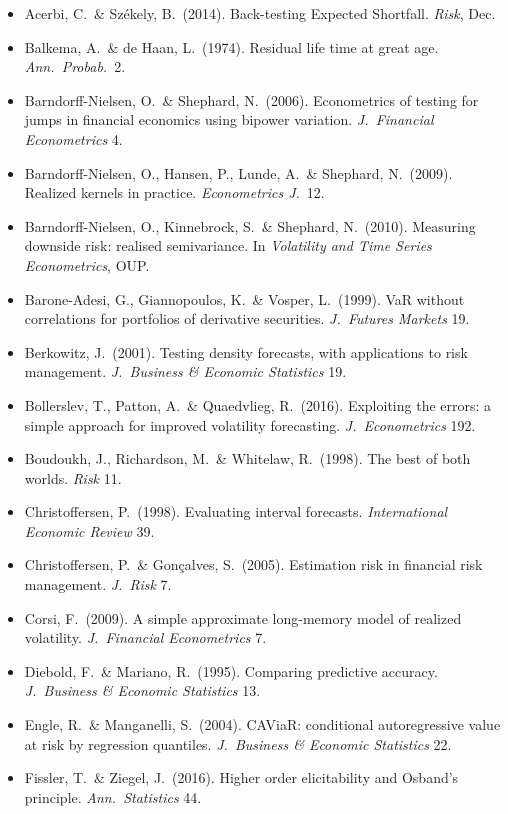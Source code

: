 \documentclass[11pt,a4paper]{article}
\begin{document}
{\small
\begin{itemize}[nosep,leftmargin=*]
\item Acerbi, C.\ \& Székely, B.\ (2014). Back-testing Expected Shortfall. \emph{Risk}, Dec.
\item Balkema, A.\ \& de Haan, L.\ (1974). Residual life time at great age. \emph{Ann.\ Probab.}\ 2.
\item Barndorff-Nielsen, O.\ \& Shephard, N.\ (2006). Econometrics of testing for jumps in financial economics using bipower variation. \emph{J.\ Financial Econometrics} 4.
\item Barndorff-Nielsen, O., Hansen, P., Lunde, A.\ \& Shephard, N.\ (2009). Realized kernels in practice. \emph{Econometrics J.}\ 12.
\item Barndorff-Nielsen, O., Kinnebrock, S.\ \& Shephard, N.\ (2010). Measuring downside risk: realised semivariance. In \emph{Volatility and Time Series Econometrics}, OUP.
\item Barone-Adesi, G., Giannopoulos, K.\ \& Vosper, L.\ (1999). VaR without correlations for portfolios of derivative securities. \emph{J.\ Futures Markets} 19.
\item Berkowitz, J.\ (2001). Testing density forecasts, with applications to risk management. \emph{J.\ Business \& Economic Statistics} 19.
\item Bollerslev, T., Patton, A.\ \& Quaedvlieg, R.\ (2016). Exploiting the errors: a simple approach for improved volatility forecasting. \emph{J.\ Econometrics} 192.
\item Boudoukh, J., Richardson, M.\ \& Whitelaw, R.\ (1998). The best of both worlds. \emph{Risk} 11.
\item Christoffersen, P.\ (1998). Evaluating interval forecasts. \emph{International Economic Review} 39.
\item Christoffersen, P.\ \& Gon\c{c}alves, S.\ (2005). Estimation risk in financial risk management. \emph{J.\ Risk} 7.
\item Corsi, F.\ (2009). A simple approximate long-memory model of realized volatility. \emph{J.\ Financial Econometrics} 7.
\item Diebold, F.\ \& Mariano, R.\ (1995). Comparing predictive accuracy. \emph{J.\ Business \& Economic Statistics} 13.
\item Engle, R.\ \& Manganelli, S.\ (2004). CAViaR: conditional autoregressive value at risk by regression quantiles. \emph{J.\ Business \& Economic Statistics} 22.
\item Fissler, T.\ \& Ziegel, J.\ (2016). Higher order elicitability and Osband's principle. \emph{Ann.\ Statistics} 44.

\end{itemize}}
\end{document}
